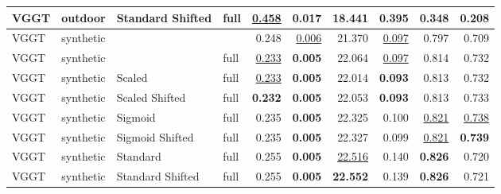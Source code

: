 \begin{table}[H]
\begin{tabular}{llllrrrrrr}
VGGT & outdoor & Standard Shifted & full & \underline{0.458} & \textbf{0.017} & 18.441 & 0.395 & 0.348 & 0.208 \\
\midrule
VGGT & synthetic &  &  & 0.248 & \underline{0.006} & 21.370 & \underline{0.097} & 0.797 & 0.709 \\
VGGT & synthetic &  & full & \underline{0.233} & \textbf{0.005} & 22.064 & \underline{0.097} & 0.814 & 0.732 \\
VGGT & synthetic & Scaled & full & \underline{0.233} & \textbf{0.005} & 22.014 & \textbf{0.093} & 0.813 & 0.732 \\
VGGT & synthetic & Scaled Shifted & full & \textbf{0.232} & \textbf{0.005} & 22.053 & \textbf{0.093} & 0.813 & 0.733 \\
VGGT & synthetic & Sigmoid & full & 0.235 & \textbf{0.005} & 22.325 & 0.100 & \underline{0.821} & \underline{0.738} \\
VGGT & synthetic & Sigmoid Shifted & full & 0.235 & \textbf{0.005} & 22.327 & 0.099 & \underline{0.821} & \textbf{0.739} \\
VGGT & synthetic & Standard & full & 0.255 & \textbf{0.005} & \underline{22.516} & 0.140 & \textbf{0.826} & 0.720 \\
VGGT & synthetic & Standard Shifted & full & 0.255 & \textbf{0.005} & \textbf{22.552} & 0.139 & \textbf{0.826} & 0.721 \\
\bottomrule
\end{tabular}
\end{table}